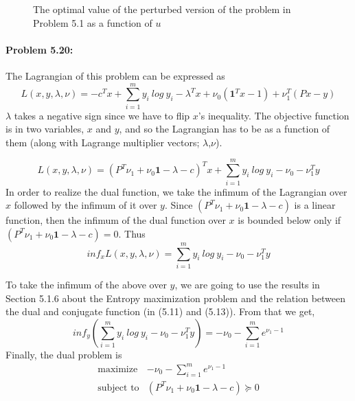 \documentclass[12pt] {article}
\begin{document}
\begin{enumerate}[(a)]
\begin{figure}[!tbh]
\centering        
   \caption{The optimal value of the perturbed version of the problem in Problem 5.1 as a function of $u$}
   \label{fig:5_1_d}
\end{figure}

\end{enumerate}

\paragraph{Problem 5.20:} 
The Lagrangian of this problem can be expressed as 
$$
L(x,y,\lambda, \nu) = -c^{T}x + \sum^{m}_{i=1}y_{i}\ log\ y_{i} - \lambda^{T}x + \nu_{0}(\textbf{1}^{T}x -1) + \nu_{1}^{T}(Px-y)
$$
$\lambda$ takes a negative sign since we have to flip $x$'s inequality. The objective function is in two variables, $x$ and $y$, and so the Lagrangian has to be as a function of them (along with Lagrange multiplier vectors; $\lambda$,$\nu$).  

$$
L(x,y,\lambda, \nu) = (P^{T}\nu_{1} + \nu_{0}\textbf{1} -\lambda -c)^{T} x + \sum^{m}_{i=1}y_{i}\ log\ y_{i} - \nu_{0} - \nu^{T}_{1}y
$$
In order to realize the dual function, we take the infimum of the Lagrangian over $x$ followed by the infimum of it over $y$. Since $(P^{T}\nu_{1} + \nu_{0}\textbf{1} -\lambda -c)$ is a linear function, then the infimum of the dual function over $x$ is bounded below only if $(P^{T}\nu_{1} + \nu_{0}\textbf{1} -\lambda -c) = 0$. Thus
\[
inf_{x}L(x,y,\lambda, \nu) = \sum^{m}_{i=1}y_{i}\ log\ y_{i} - \nu_{0} - \nu^{T}_{1}y
\]

To take the infimum of the above over $y$, we are going to use the results in Section 5.1.6 about the Entropy maximization problem and the relation between the dual and conjugate function (in (5.11) and (5.13)). From that we get,
\[
inf_{y} \left( \sum^{m}_{i=1}y_{i}\ log\ y_{i} - \nu_{0} - \nu^{T}_{1}y \right) = -\nu_{0} -\sum_{i=1}^{m}e^{\nu_{1}-1} 
\]
Finally, the dual problem is
\[
\begin{array}{cl}
\text{maximize} & -\nu_{0} -\sum_{i=1}^{m}e^{\nu_{1}-1} \\
\text{subject to} & (P^{T}\nu_{1} + \nu_{0}\textbf{1} -\lambda -c) \succeq 0
\end{array} 
\]
\end{document}
